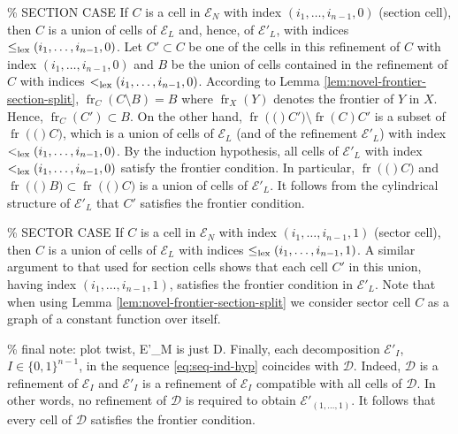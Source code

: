 \documentclass[
]{book}
\theoremstyle{definition}
\theoremstyle{definition}
\theoremstyle{definition}
\theoremstyle{definition}
\theoremstyle{remark}
\begin{document}
\% SECTION CASE
If \(C\) is a cell in \({\mathcal E}_N\) with index \((i_1, \ldots ,i_{n-1} ,0)\) (section cell),
then \(C\) is a union of cells of \({\mathcal E}_L\) and, hence, of \(\mathcal{E}'_L\), with indices \(\le_{\rm{lex}}(i_1, \ldots ,i_{n-1} ,0)\).
Let \(C' \subset C\) be one of the cells in this refinement of \(C\) with index \((i_1, \ldots ,i_{n-1} ,0)\) and \(B\) be
the union of cells contained in the refinement of \(C\) with indices \(<_{\rm{lex}}(i_1, \ldots ,i_{n-1} ,0)\).
According to Lemma \ref{lem:novel-frontier-section-split}, \({\operatorname{fr}_{C} \left( C \setminus B \right)}=B\) where \({\operatorname{fr}_{X} \left( Y \right)}\) denotes the frontier of \(Y\) in \(X\).
Hence, \({\operatorname{fr}_{C} \left( C' \right)} \subset B\).
On the other hand, \({\operatorname{fr} \left( ( \right)}C') \setminus {\operatorname{fr} \left( C \right)}{C'}\) is a subset of \({\operatorname{fr} \left( ( \right)}C)\), which is a union of cells of \(\mathcal{E}_L\) (and of the refinement \(\mathcal{E}'_L\)) with index \(<_{\rm{lex}}(i_1,\ldots,i_{n-1},0)\).
By the induction hypothesis, all cells of \(\mathcal{E}'_L\) with index \(<_{\rm{lex}}(i_1,\ldots,i_{n-1},0)\) satisfy the frontier condition. In particular, \({\operatorname{fr} \left( ( \right)}C)\) and \({\operatorname{fr} \left( ( \right)}B)\subset {\operatorname{fr} \left( ( \right)}C)\) is a union of cells of \(\mathcal{E}'_L\).
It follows from the cylindrical structure of \(\mathcal{E}'_L\) that \(C'\) satisfies the frontier condition.

\% SECTOR CASE
If \(C\) is a cell in \({\mathcal E}_N\) with index \((i_1, \ldots ,i_{n-1} ,1)\) (sector cell),
then \(C\) is a union of cells of \({\mathcal E}_L\) with indices \(\le_{\rm{lex}}(i_1, \ldots ,i_{n-1} ,1)\).
A similar argument to that used for section cells shows that each cell \(C'\) in this union,
having index \((i_1, \ldots ,i_{n-1} ,1)\), satisfies the frontier condition in \(\mathcal{E}'_L\). Note that when using
Lemma \ref{lem:novel-frontier-section-split} we consider sector cell \(C\) as a graph of a constant function over itself.

\% final note: plot twist, E'\_M is just D.
Finally, each decomposition \(\mathcal{E}'_I\), \(I \in \{0,1\}^{n-1}\), in the sequence \ref{eq:seq-ind-hyp} coincides with \(\mathcal{D}\). Indeed, \(\mathcal{D}\) is a refinement of \(\mathcal{E}_I\) and \(\mathcal{E}'_I\) is a refinement of \(\mathcal{E}_I\) compatible with all cells of \(\mathcal{D}\). In other words, no refinement of \(\mathcal{D}\) is required to obtain \(\mathcal{E}'_{(1,\ldots,1)}\).
It follows that every cell of \(\mathcal{D}\) satisfies the frontier condition.
\end{document}
